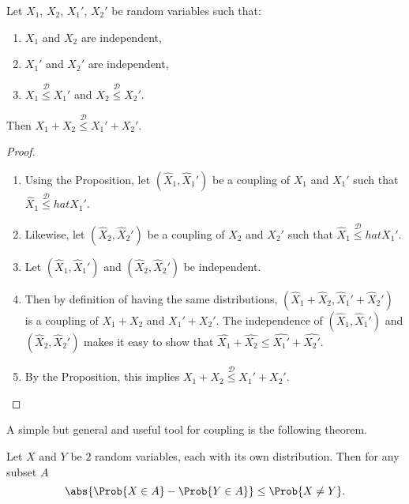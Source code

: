 \documentclass[12pt]{article}
\begin{document}
\begin{corollary}
    \label{cor:introcoupling:couplingsum} Let \( X_1 \), \( X_2 \), \( X_1'
    \), \( X_2' \) be random variables such that:
    \begin{enumerate}
        \item
            \( X_1 \) and \( X_2 \) are independent,
        \item
            \( X_1' \) and \( X_2' \) are independent,
        \item
            \( X_1\stackrel{\mathcal{D}}{\le} X_1' \) and \( X_2\stackrel
            {\mathcal{D}}{\le} X_2' \).
    \end{enumerate}
    Then \( X_1 + X_2 \stackrel{\mathcal{D}}{\le} X_1' + X_2' \).
\end{corollary}

\begin{proof}
    \begin{enumerate}
        \item
            Using the Proposition, let \( (\hat{X}_1, \hat{X}_1') \) be
            a coupling of \( X_1 \) and \( X_1' \) such that \( \hat{X}_1
            \stackrel{\mathcal{D}}{\le} hat{X}_1' \).
        \item
            Likewise, let \( (\hat{X}_2, \hat{X}_2') \) be a coupling of
            \( X_2 \) and \( X_2' \) such that \( \hat{X}_1 \stackrel{\mathcal
            {D}}{\le} hat{X}_1' \).
        \item
            Let \( (\hat{X}_1, \hat{X}_1') \) and \( (\hat{X}_2, \hat{X}_2')
            \) be independent.
        \item
            Then by definition of having the same distributions, \( (\hat
            {X}_1 + \hat{X}_2, \hat{X}_1' + \hat{X}_2') \) is a coupling
            of \( X_1 + X_2 \) and \( X_1' + X_2' \).  The independence
            of \( (\hat{X}_1, \hat{X}_1') \) and \( (\hat{X}_2, \hat{X}_2')
            \) makes it easy to show that \( \hat{X_1} + \hat{X_2} \le
            \hat{X_1'} + \hat{X_2'} \).
        \item
            By the Proposition, this implies \( X_1 + X_2 \stackrel{\mathcal
            {D}}{\le}X_1 ' + X_2' \).
    \end{enumerate}
\end{proof}

A simple but general and useful tool for coupling is the following
theorem.

\begin{theorem}
    Let \( X \) and \( Y \) be \( 2 \) random variables, each with its
    own distribution.  Then for any subset \( A \)
    \[
        \abs{\Prob{X \in A} - \Prob{Y \in A}} \le \Prob{X \ne Y}.
    \]
\end{theorem}
\end{document}
